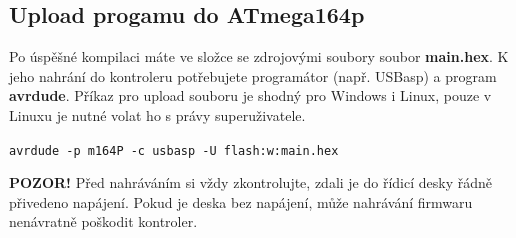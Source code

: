 \documentclass[11pt, a4paper]{article}
\begin{document}
\subsection{Upload progamu do ATmega164p}

Po úspěšné kompilaci máte ve složce se zdrojovými soubory soubor \textbf{main.hex}. K jeho nahrání do kontroleru potřebujete programátor (např. USBasp) a program \textbf{avrdude}. Příkaz pro upload souboru je shodný pro Windows i Linux, pouze v Linuxu je nutné volat ho s právy superuživatele.

\texttt{avrdude -p m164P -c usbasp -U flash:w:main.hex}

\textbf{POZOR!} Před nahráváním si vždy zkontrolujte, zdali je do řídicí desky řádně přivedeno napájení. Pokud je deska bez napájení, může nahrávání firmwaru nenávratně poškodit kontroler.
\end{document}
